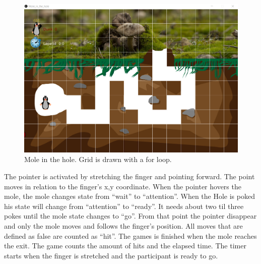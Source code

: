 \begin{figure}[h]  %
  \centering
  \includegraphics[width=.5\textwidth]{figures/Grid-processing-Mole_in_the_hole.png}
  \caption[Mole in the hole grid processing.]{Mole in the hole. Grid is drawn with a for loop.}
  \label{fig:setup}
\end{figure}

The pointer is activated by stretching the finger and pointing forward. The point moves in relation to the finger’s x,y coordinate. When the pointer hovers the mole, the mole changes state from “wait” to “attention”. When the Hole is poked his state will change from “attention” to “ready”. It needs about two til three pokes until the mole state changes to “go”. From that point the pointer disappear and only the mole moves and follows the finger’s position. All moves that are defined as false are counted as “hit”. The games is finished when the mole reaches the exit. The game counts the amount of hits and the elapsed time. The timer starts when the finger is stretched and the participant is ready to go.

